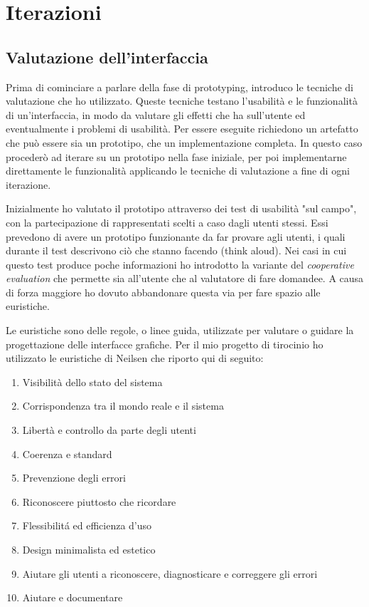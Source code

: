 \documentclass[Lau, oneside, noexaminfo]{sapthesis}%
\begin{document}
\section{Iterazioni}
\subsection{Valutazione dell'interfaccia}
\label{heuristics}
Prima di cominciare a parlare della fase di prototyping, introduco le tecniche di valutazione che ho utilizzato. Queste tecniche testano l'usabilità e le funzionalità di un'interfaccia, in modo da valutare gli effetti che ha sull'utente ed eventualmente i problemi di usabilità. Per essere eseguite richiedono un artefatto che può essere sia un prototipo, che un implementazione completa. In questo caso procederò ad iterare su un prototipo nella fase iniziale, per poi implementarne direttamente le funzionalità applicando le tecniche di valutazione a fine di ogni iterazione.

Inizialmente ho valutato il prototipo attraverso dei test di usabilità "sul campo", con la partecipazione di rappresentati scelti a caso dagli utenti stessi. Essi prevedono di avere un prototipo funzionante da far provare agli utenti, i quali durante il test descrivono ciò che stanno facendo (think aloud). Nei casi in cui questo test produce poche informazioni ho introdotto la variante del \textit{cooperative evaluation} che permette sia all'utente che al valutatore di fare domandee. A causa di forza maggiore ho dovuto abbandonare questa via per fare spazio alle euristiche.

Le euristiche sono delle regole, o linee guida, utilizzate per valutare o guidare la progettazione delle interfacce grafiche. Per il mio progetto di tirocinio ho utilizzato le euristiche di Neilsen che riporto qui di seguito:
\begin{enumerate}
	\item Visibilità dello stato del sistema
	\item Corrispondenza tra il mondo reale e il sistema
	\item Libertà e controllo da parte degli utenti
	\item Coerenza e standard
	\item Prevenzione degli errori
	\item Riconoscere piuttosto che ricordare
	\item Flessibilit\'a ed efficienza d'uso 
	\item Design minimalista ed estetico
	\item Aiutare gli utenti a riconoscere, diagnosticare e correggere gli errori
	\item Aiutare e documentare
\end{enumerate}
\end{document}
